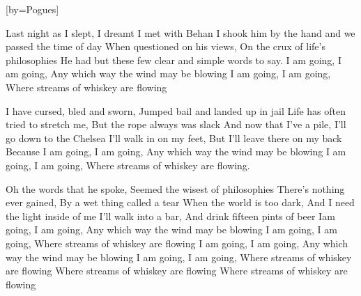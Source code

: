 

[by=Pogues]

\begin{LARGE}


\beginverse
Last night as I slept, I dreamt I met with Behan
I shook him by the hand and we passed the time of day
When questioned on his views, On the crux of life's philosophies
He had but these few clear and simple words to say.
I am going, I am going, Any which way the wind may be blowing
I am going, I am going, Where streams of whiskey are flowing
\endverse

\beginverse
I have cursed, bled and sworn, Jumped bail and landed up in jail
Life has often tried to stretch me, But the rope always was slack
And now that I've a pile, I'll go down to the Chelsea
I'll walk in on my feet, But I'll leave there on my back
Because I am going, I am going, Any which way the wind may be blowing
I am going, I am going, Where streams of whiskey are flowing.
\endverse

\beginverse
Oh the words that he spoke, Seemed the wisest of philosophies
There's nothing ever gained, By a wet thing called a tear
When the world is too dark, And I need the light inside of me
I'll walk into a bar, And drink fifteen pints of beer
Iam going, I am going, Any which way the wind may be blowing
I am going, I am going, Where streams of whiskey are flowing
I am going, I am going, Any which way the wind may be blowing
I am going, I am going, Where streams of whiskey are flowing
Where streams of whiskey are flowing
Where streams of whiskey are flowing
\endverse


\end{LARGE}


\chordson
\endsong
